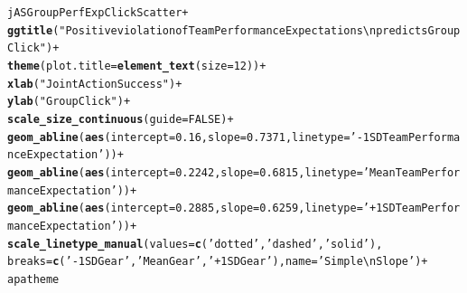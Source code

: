 \documentclass[english]{article}\usepackage[]{graphicx}\usepackage[]{color}
\makeatletter
\newcommand{\hlnum}[1]{\textcolor[rgb]{0.686,0.059,0.569}{#1}}%
\newcommand{\hlstr}[1]{\textcolor[rgb]{0.192,0.494,0.8}{#1}}%
\newcommand{\hlopt}[1]{\textcolor[rgb]{0,0,0}{#1}}%
\newcommand{\hlstd}[1]{\textcolor[rgb]{0.345,0.345,0.345}{#1}}%
\newcommand{\hlkwc}[1]{\textcolor[rgb]{0.333,0.667,0.333}{#1}}%
\newcommand{\hlkwd}[1]{\textcolor[rgb]{0.737,0.353,0.396}{\textbf{#1}}}%
\newenvironment{kframe}{%
 \def\at@end@of@kframe{}%
 \ifinner\ifhmode%
  \def\at@end@of@kframe{\end{minipage}}%
  \begin{minipage}{\columnwidth}%
 \fi\fi%
 \def\FrameCommand##1{\hskip\@totalleftmargin \hskip-\fboxsep
 \colorbox{shadecolor}{##1}\hskip-\fboxsep
     \hskip-\linewidth \hskip-\@totalleftmargin \hskip\columnwidth}%
 \MakeFramed {\advance\hsize-\width
   \@totalleftmargin\z@ \linewidth\hsize
   \@setminipage}}%
 {\par\unskip\endMakeFramed%
 \at@end@of@kframe}
\newenvironment{knitrout}{}{} %
\makeatother
\begin{document}
\begin{knitrout}
\begin{kframe}
\begin{alltt}
\hlstd{jASGroupPerfExpClickScatter} \hlopt{+}
            \hlkwd{ggtitle}\hlstd{(}\hlstr{"Positive violation of Team Performance Expectations \textbackslash{}n predicts Group Click"}\hlstd{)} \hlopt{+}
            \hlkwd{theme}\hlstd{(}\hlkwc{plot.title} \hlstd{=} \hlkwd{element_text}\hlstd{(}\hlkwc{size}\hlstd{=}\hlnum{12}\hlstd{))} \hlopt{+}
            \hlkwd{xlab}\hlstd{(}\hlstr{"Joint Action Success"}\hlstd{)} \hlopt{+}
            \hlkwd{ylab}\hlstd{(}\hlstr{"Group Click"}\hlstd{)} \hlopt{+}
            \hlkwd{scale_size_continuous}\hlstd{(}\hlkwc{guide} \hlstd{=} \hlnum{FALSE}\hlstd{)}\hlopt{+}
            \hlkwd{geom_abline}\hlstd{(}\hlkwd{aes}\hlstd{(}\hlkwc{intercept}\hlstd{=}\hlnum{0.16}\hlstd{,} \hlkwc{slope}\hlstd{=}\hlnum{0.7371}\hlstd{,} \hlkwc{linetype}\hlstd{=}\hlstr{'-1SD TeamPerformanceExpectation'}\hlstd{))}\hlopt{+}
            \hlkwd{geom_abline}\hlstd{(}\hlkwd{aes}\hlstd{(}\hlkwc{intercept}\hlstd{=}\hlnum{0.2242}\hlstd{,} \hlkwc{slope}\hlstd{=}\hlnum{0.6815}\hlstd{,} \hlkwc{linetype}\hlstd{=}\hlstr{'Mean TeamPerformanceExpectation'}\hlstd{))}\hlopt{+}
            \hlkwd{geom_abline}\hlstd{(}\hlkwd{aes}\hlstd{(}\hlkwc{intercept}\hlstd{=}\hlnum{0.2885}\hlstd{,} \hlkwc{slope}\hlstd{=}\hlnum{0.6259}\hlstd{,} \hlkwc{linetype}\hlstd{=}\hlstr{'+1SDTeamPerformanceExpectation'}\hlstd{))}\hlopt{+}
            \hlkwd{scale_linetype_manual}\hlstd{(}\hlkwc{values}\hlstd{=}\hlkwd{c}\hlstd{(}\hlstr{'dotted'}\hlstd{,}\hlstr{'dashed'}\hlstd{,}\hlstr{'solid'}\hlstd{),}
            \hlkwc{breaks}\hlstd{=}\hlkwd{c}\hlstd{(}\hlstr{'-1SD Gear'}\hlstd{,}\hlstr{'Mean Gear'}\hlstd{,}\hlstr{'+1SD Gear'}\hlstd{),}\hlkwc{name}\hlstd{=}\hlstr{'Simple\textbackslash{}nSlope'}\hlstd{)}\hlopt{+}
            \hlstd{apatheme}
\end{alltt}


{\ttfamily\noindent\color{warningcolor}{\#\# Warning: Removed 1 rows containing missing values (geom\_point).}}\end{kframe}\begin{figure}


\end{figure}
\end{knitrout}
\end{document}
